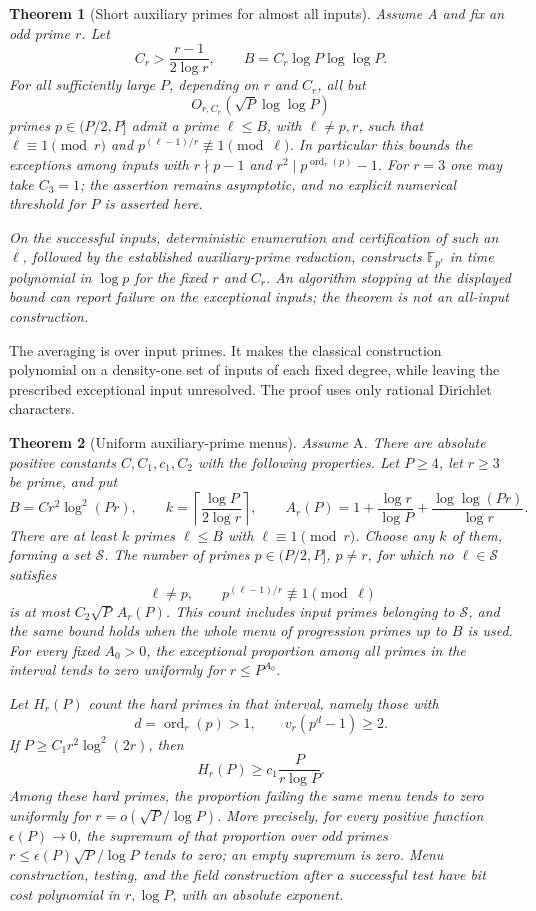 \documentclass[11pt]{article}
\newtheorem{theorem}{Theorem}[section]
\theoremstyle{definition}
\theoremstyle{remark}
\begin{document}
\begin{theorem}[Short auxiliary primes for almost all inputs]\label{thm:fixed-r-almost-all-auxiliary}
Assume A and fix an odd prime $r$.  Let
\[
 C_r>\frac{r-1}{2\log r},\qquad
 B=C_r\log P\log\log P.
\]
For all sufficiently large $P$, depending on $r$ and $C_r$, all but
\[
 O_{r,C_r}\!\left(\sqrt P\log\log P\right)
\]
primes $p\in(P/2,P]$ admit a prime $\ell\le B$, with $\ell\ne p,r$, such that $\ell\equiv1\pmod r$ and $p^{(\ell-1)/r}\not\equiv1\pmod\ell$.
In particular this bounds the exceptions among inputs with $r\nmid p-1$ and $r^2\mid p^{\operatorname{ord}_r(p)}-1$.
For $r=3$ one may take $C_3=1$; the assertion remains asymptotic,
and no explicit numerical threshold for $P$ is asserted here.

On the successful inputs, deterministic enumeration and certification
of such an $\ell$, followed by the established auxiliary-prime
reduction, constructs $\mathbb F_{p^r}$ in time polynomial in
$\log p$ for the fixed $r$ and $C_r$.  An algorithm stopping at the displayed bound
can report failure on the exceptional inputs; the theorem is not an
all-input construction.
\end{theorem}
The averaging is over input primes. It makes the classical construction polynomial on a density-one set of inputs of each fixed degree, while leaving the prescribed exceptional input unresolved. The proof uses only rational Dirichlet characters.

\begin{theorem}[Uniform auxiliary-prime menus]\label{thm:selected-menu-auxiliary}
Assume \(\mathrm A\). There are absolute positive constants
\(C,C_1,c_1,C_2\) with the following properties.
Let \(P\ge4\), let \(r\ge3\) be prime, and put
\[
 B=Cr^2\log^2(Pr),\qquad
 k=\left\lceil\frac{\log P}{2\log r}\right\rceil,\qquad
 A_r(P)=1+\frac{\log r}{\log P}
              +\frac{\log\log(Pr)}{\log r}.
\]
There are at least \(k\) primes \(\ell\le B\) with
\(\ell\equiv1\pmod r\). Choose any \(k\) of them, forming
a set \(\mathcal S\). The number of primes
\(p\in(P/2,P]\), \(p\ne r\), for which no
\(\ell\in\mathcal S\) satisfies
\[
 \ell\ne p,\qquad p^{(\ell-1)/r}\not\equiv1\pmod\ell
\]
is at most \(C_2\sqrt P\,A_r(P)\). This count includes input
primes belonging to \(\mathcal S\), and the same bound holds
when the whole menu of progression primes up to \(B\) is used.
For every fixed \(A_0>0\), the exceptional proportion among
all primes in the interval tends to zero uniformly for
\(r\le P^{A_0}\).

Let \(H_r(P)\) count the hard primes in that interval, namely those with
\[
 d=\operatorname{ord}_r(p)>1,\qquad v_r(p^d-1)\ge2.
\]
If \(P\ge C_1r^2\log^2(2r)\), then
\[
 H_r(P)\ge c_1\frac{P}{r\log P}.
\]
Among these hard primes, the proportion failing the same menu
tends to zero uniformly for \(r=o(\sqrt P/\log P)\).
More precisely, for every positive function \(\epsilon(P)\to0\),
the supremum of that proportion over odd primes
\(r\le\epsilon(P)\sqrt P/\log P\) tends to zero; an empty
supremum is zero. Menu construction, testing, and the field
construction after a successful test have bit cost polynomial
in \(r,\log P\), with an absolute exponent.
\end{theorem}
\end{document}
